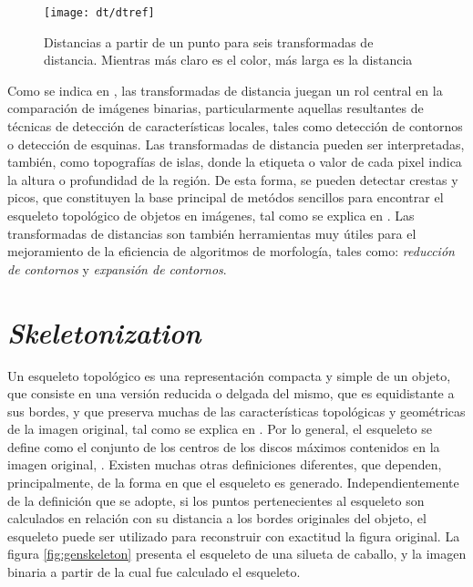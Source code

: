 \begin{figure}[h t b p ! H]
 \centering
   \texttt{[image: dt/dtref]}
 \caption[Distancias a partir de un punto para seis transformadas de distancia]{ 
   Distancias a partir de un punto para seis transformadas de distancia. Mientras 
   m\'as claro es el color, m\'as larga es la distancia \cite[p.365]{dtresearch}}
 \label{fig:dtexamples}
\end{figure}

Como se indica en \cite{dtresearch2}, las transformadas de distancia juegan un rol
central en la comparaci\'on de im\'agenes binarias, particularmente aquellas
resultantes de t\'ecnicas de detecci\'on de caracter\'isticas locales, tales 
como detecci\'on de contornos o detecci\'on de esquinas.
Las transformadas de distancia pueden ser interpretadas, tambi\'en, como
topograf\'ias de islas, donde la etiqueta o valor de cada pixel indica la altura o 
profundidad de la regi\'on. De esta forma, se pueden detectar crestas y picos, 
que constituyen la base principal de met\'odos sencillos para encontrar el 
esqueleto topol\'ogico de objetos en im\'agenes, tal como se explica en \cite[p.237]{ridgedt}.
Las transformadas de distancias son tambi\'en herramientas muy \'utiles para el 
mejoramiento de la eficiencia de algoritmos de morfolog\'ia, tales como: 
\emph{reducci\'on de contornos} y \emph{expansi\'on de contornos}.\\

\section{\emph{Skeletonization}}
\label{sec:skeletonization}

Un esqueleto topol\'ogico es una representaci\'on compacta y simple de un objeto, que
consiste en una versi\'on reducida o delgada del mismo, que es equidistante a sus bordes, 
y que preserva muchas de las caracter\'isticas topol\'ogicas y geom\'etricas de la
imagen original, tal como se explica en \cite{wikipedia:skeleton,ssm,augmented}. 
Por lo general, el esqueleto se define como el conjunto de los centros de los discos m\'aximos
contenidos en la imagen original, \cite{ssm,augmented}. Existen muchas otras definiciones diferentes,
que dependen, principalmente, de la forma en que el esqueleto es generado.
Independientemente de la definici\'on que se adopte, si los puntos pertenecientes al esqueleto
son calculados en relaci\'on con su distancia a los bordes originales del objeto, 
el esqueleto puede ser utilizado para reconstruir con exactitud la figura original.
La figura \ref{fig:genskeleton} presenta el esqueleto de una silueta de caballo, y la
imagen binaria a partir de la cual fue calculado el esqueleto.

